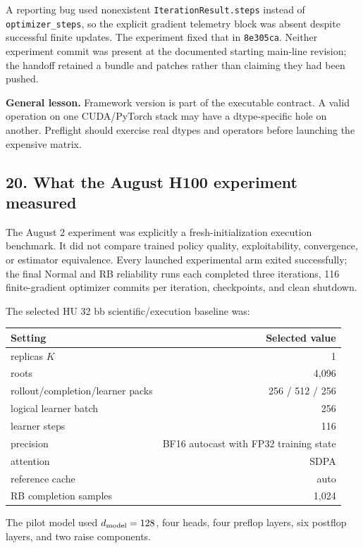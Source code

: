 \documentclass[
  10pt,
  letterpaper,
]{article}
\newcounter{none} %
\begin{document}
A reporting bug used nonexistent \texttt{IterationResult.steps} instead
of \texttt{optimizer\_steps}, so the explicit gradient telemetry block
was absent despite successful finite updates. The experiment fixed that
in \texttt{8e305ca}. Neither experiment commit was present at the
documented starting main-line revision; the handoff retained a bundle
and patches rather than claiming they had been pushed.

\textbf{General lesson.} Framework version is part of the executable
contract. A valid operation on one CUDA/PyTorch stack may have a
dtype-specific hole on another. Preflight should exercise real dtypes
and operators before launching the expensive matrix.

\subsection{20. What the August H100 experiment
measured}\label{20-what-the-august-h100-experiment-measured}

The August 2 experiment was explicitly a fresh-initialization execution
benchmark. It did not compare trained policy quality, exploitability,
convergence, or estimator equivalence. Every launched experimental arm
exited successfully; the final Normal and RB reliability runs each
completed three iterations, 116 finite-gradient optimizer commits per
iteration, checkpoints, and clean shutdown.

The selected HU 32 bb scientific/execution baseline was:

{\def\LTcaptype{none} %
\begin{longtable}[]{@{}lr@{}}
\toprule\noalign{}
Setting & Selected value \\
\midrule\noalign{}
\endhead
\bottomrule\noalign{}
\endlastfoot
replicas \(K\) & 1 \\
roots & 4,096 \\
rollout/completion/learner packs & 256 / 512 / 256 \\
logical learner batch & 256 \\
learner steps & 116 \\
precision & BF16 autocast with FP32 training state \\
attention & SDPA \\
reference cache & auto \\
RB completion samples & 1,024 \\
\end{longtable}
}

The pilot model used \(d_{\rm model}=128\), four heads, four preflop
layers, six postflop layers, and two raise components.
\end{document}
